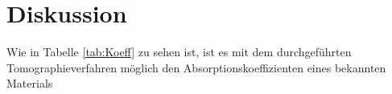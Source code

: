 

\section{Diskussion}
Wie in Tabelle \ref{tab:Koeff} zu sehen ist, ist es mit dem durchgeführten Tomographieverfahren 
möglich den Absorptionskoeffizienten eines bekannten Materials